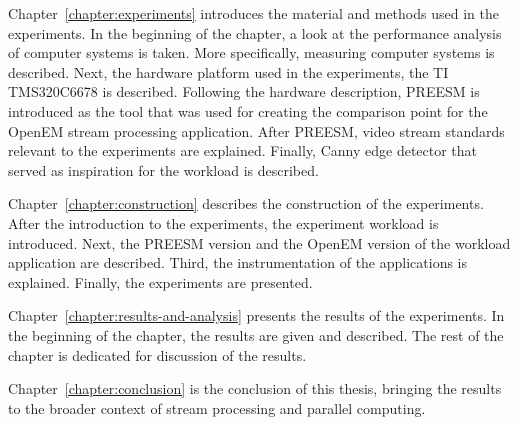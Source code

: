 Chapter~\ref{chapter:experiments} introduces the material and methods used in the experiments. In the beginning of the chapter, a look at the performance analysis of computer systems is taken. More specifically, measuring computer systems is described. Next, the hardware platform used in the experiments, the TI TMS320C6678 is described. Following the hardware description, PREESM is introduced as the tool that was used for creating the comparison point for the OpenEM stream processing application. After PREESM, video stream standards relevant to the experiments are explained. Finally, Canny edge detector that served as inspiration for the workload is described.

Chapter~\ref{chapter:construction} describes the construction of the experiments. After the introduction to the experiments, the experiment workload is introduced. Next, the PREESM version and the OpenEM version of the workload application are described. Third, the instrumentation of the applications is explained. Finally, the experiments are presented.

Chapter~\ref{chapter:results-and-analysis} presents the results of the experiments. In the beginning of the chapter, the results are given and described. The rest of the chapter is dedicated for discussion of the results.

Chapter~\ref{chapter:conclusion} is the conclusion of this thesis, bringing the results to the broader context of stream processing and parallel computing.
